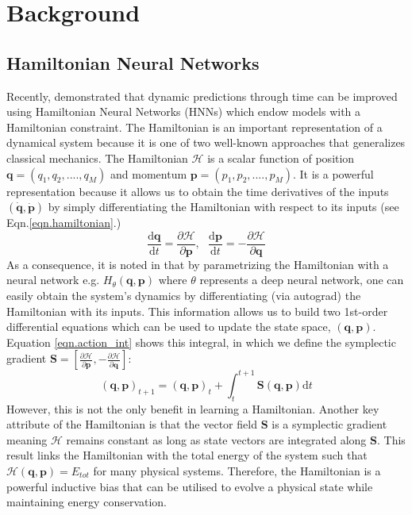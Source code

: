 \documentclass[twoside]{article}
\begin{document}
\section{Background}

\subsection{Hamiltonian Neural Networks}

Recently, \cite{greydanus_hamiltonian_2019} demonstrated that dynamic predictions through time can be improved using Hamiltonian Neural Networks (HNNs) which endow models with a Hamiltonian constraint. The Hamiltonian is an important representation of a dynamical system because it is one of two well-known approaches that generalizes classical mechanics. The Hamiltonian $\mathcal{H}$ is a scalar function of position $\mathbf{q} = (q_1,q_2,....,q_M)$ and momentum $\mathbf{p} = (p_1,p_2,....,p_M)$. It is a powerful representation because it allows us to obtain the time derivatives of the inputs $(\dot{\mathbf{q}},\dot{\mathbf{p}})$ by simply differentiating the Hamiltonian with respect to its inputs (see Eqn.\ref{eqn.hamiltonian}.)
\begin{equation}
\frac{\mathrm{d}\mathbf{q}}{\mathrm{d}t} = \frac{\partial \mathcal{H}}{\partial \mathbf{p}}, ~~~
\frac{\mathrm{d}\mathbf{p}}{\mathrm{d}t} = -\frac{\partial \mathcal{H}}{\partial \mathbf{q}}
\label{eqn.hamiltonian}
\end{equation}
As a consequence, it is noted in \cite{greydanus_hamiltonian_2019} that by parametrizing the Hamiltonian with a neural network e.g. $H_{\theta}(\mathbf{q},\mathbf{p})$ where $\theta$ represents a deep neural network, one can easily obtain the system's dynamics by differentiating (via autograd) the Hamiltonian with its inputs. This information allows us to build two 1st-order differential equations which can be used to update the state space, $(\mathbf{q},\mathbf{p})$. Equation \ref{eqn.action_int} shows this integral, in which we define the symplectic gradient $\mathbf{S}  = \left [ \frac{\partial \mathcal{H}}{\partial \mathbf{p}},-\frac{\partial \mathcal{H}}{\partial \mathbf{q}} \right ] $:
\begin{equation}
(\mathbf{q},\mathbf{p})_{t+1} = (\mathbf{q},\mathbf{p})_t + \int_t^{t+1} \mathbf{S}(\mathbf{q},\mathbf{p}) \mathrm{d}t
\label{eqn.action_int}
\end{equation}
However, this is not the only benefit in learning a Hamiltonian. Another key attribute of the Hamiltonian is that the vector field $\mathbf{S}$ is a symplectic gradient meaning $\mathcal{H}$ remains constant as long as state vectors are integrated along $\mathbf{S}$. This result links the Hamiltonian with the total energy of the system such that $\mathcal{H}(\mathbf{q},\mathbf{p}) = E_{tot}$ for many physical systems. Therefore, the Hamiltonian is a powerful inductive bias that can be utilised to evolve a physical state while maintaining energy conservation. 
\end{document}
